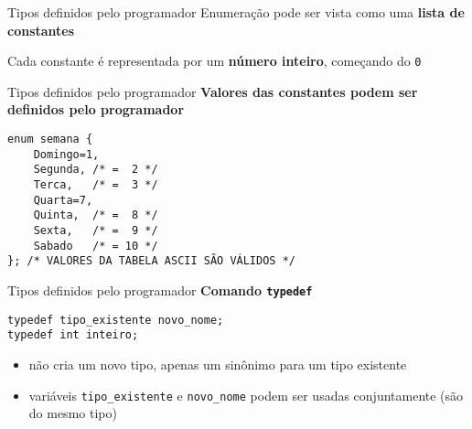 \documentclass[10pt]{beamer}
\begin{document}
\begin{frame}[fragile]{Tipos definidos pelo programador}
    \huge
    Enumeração pode ser vista como uma \textbf{lista de constantes}

    \bigskip

    Cada constante é representada por um \textbf{número inteiro}, começando do \texttt{0}

\end{frame}

\begin{frame}[fragile]{Tipos definidos pelo programador}
    \huge
    \textbf{Valores das constantes podem ser definidos pelo programador}

    \large
    \begin{verbatim}
enum semana {
    Domingo=1,
    Segunda, /* =  2 */
    Terca,   /* =  3 */
    Quarta=7,
    Quinta,  /* =  8 */
    Sexta,   /* =  9 */
    Sabado   /* = 10 */
}; /* VALORES DA TABELA ASCII SÃO VÁLIDOS */
    \end{verbatim}
\end{frame}

\begin{frame}[fragile]{Tipos definidos pelo programador}
    \huge \textbf{Comando \texttt{typedef}}

    \bigskip

    \Large
    \begin{verbatim}
typedef tipo_existente novo_nome;
typedef int inteiro;
    \end{verbatim}

    \large
    \setlength{\leftmargini}{0pt}
    \begin{itemize}
        \item [] não cria um novo tipo, apenas um sinônimo para um tipo existente
        \item [] variáveis \texttt{tipo\_existente} e \texttt{novo\_nome} podem ser usadas conjuntamente (são do mesmo tipo)
    \end{itemize}
\end{frame}
\end{document}
